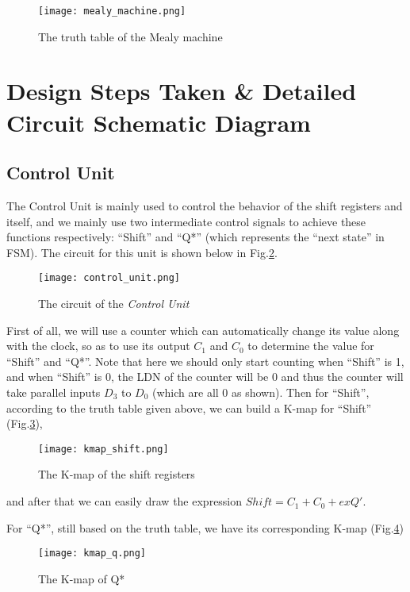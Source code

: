 \documentclass[12pt]{article}
\begin{document}
\begin{figure}[h]
    \centering
    \texttt{[image: mealy\_machine.png]}
    \caption{The truth table of the Mealy machine}
    \label{mealy}
\end{figure}

\section{Design Steps Taken \& Detailed Circuit Schematic Diagram}
\subsection{Control Unit}
The Control Unit is mainly used to control the behavior of the shift registers and itself, and we mainly use two intermediate control signals to achieve these functions respectively: “Shift” and “Q*” (which represents the “next state” in FSM). The circuit for this unit is shown below in Fig.\ref{control unit}.
\begin{figure}[h]
    \centering
    \texttt{[image: control\_unit.png]}
    \caption{The circuit of the \textit{Control Unit}}
    \label{control unit}
\end{figure}

First of all, we will use a counter which can automatically change its value along with the clock, so as to use its output $C_1$ and $C_0$ to determine the value for “Shift” and “Q*”. Note that here we should only start counting when “Shift” is 1, and when “Shift” is 0, the LDN of the counter will be 0 and thus the counter will take parallel inputs $D_3$ to $D_0$ (which are all 0 as shown). Then for “Shift”, according to the truth table given above, we can build a K-map for “Shift” (Fig.\ref{kmap shift}),

\begin{figure}[h]
    \centering
    \texttt{[image: kmap\_shift.png]}
    \caption{The K-map of the shift registers}
    \label{kmap shift}
\end{figure}

and after that we can easily draw the expression $Shift = C_1+C_0+ex Q'$. 

For “Q*”, still based on the truth table, we have its corresponding K-map (Fig.\ref{Q*})

\begin{figure}[h]
    \centering
    \texttt{[image: kmap\_q.png]}
    \caption{The K-map of Q*}
    \label{Q*}
\end{figure}
\end{document}
